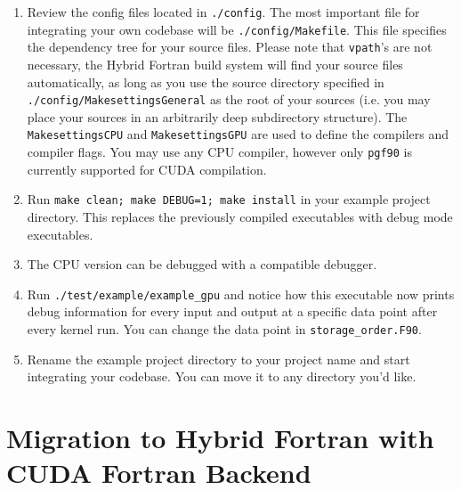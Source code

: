 \begin{enumerate}
 \item Review the config files located in \verb|./config|. The most important file for integrating your own codebase will be \verb|./config/Makefile|. This file specifies the dependency tree for your source files. Please note that \verb|vpath|'s are not necessary, the Hybrid Fortran build system will find your source files automatically, as long as you use the source directory specified in \verb|./config/MakesettingsGeneral| as the root of your sources (i.e. you may place your sources in an arbitrarily deep subdirectory structure). The \verb|MakesettingsCPU| and \verb|MakesettingsGPU| are used to define the compilers and compiler flags. You may use any CPU compiler, however only \verb|pgf90| is currently supported for CUDA compilation.
 \item Run \verb|make clean; make DEBUG=1; make install| in your example project directory. This replaces the previously compiled executables with debug mode executables.
 \item The CPU version can be debugged with a compatible debugger.
 \item Run \verb|./test/example/example_gpu| and notice how this executable now prints debug information for every input and output at a specific data point after every kernel run. You can change the data point in \verb|storage_order.F90|.
 \item Rename the example project directory to your project name and start integrating your codebase. You can move it to any directory you'd like.
\end{enumerate}

\section{Migration to Hybrid Fortran with CUDA Fortran Backend}

